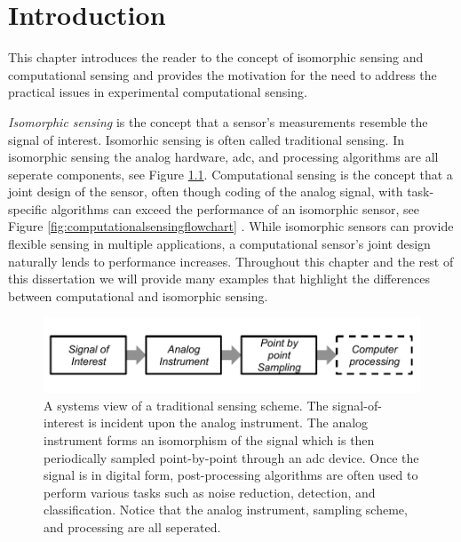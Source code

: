 

\chapter{Introduction}

This chapter introduces the reader to the concept of isomorphic sensing and computational sensing and provides the motivation for the need to address the practical issues in experimental computational sensing. 

\emph{Isomorphic sensing} is the concept that a sensor's measurements resemble the signal of interest. Isomorhic sensing is often called traditional sensing. In isomorphic sensing the analog hardware, \acrfull{adc}, and processing algorithms are all seperate components, see Figure \ref{fig:isomorphicsesingflowchart}. Computational sensing is the concept that a joint design of the sensor, often though coding of the analog signal, with task-specific algorithms can exceed the performance of an isomorphic sensor, see Figure \ref{fig:computationalsensingflowchart} \cite{neifeld2006taskSpecificSensing}. While isomorphic sensors can provide flexible sensing in multiple applications, a computational sensor's joint design naturally lends to performance increases. Throughout this chapter and the rest of this dissertation we will provide many examples that highlight the differences between computational and isomorphic sensing. 

\begin{figure}
    \centering
    \includegraphics[scale=1]{isomorphicsensorflowchart}
    \caption{A systems view of a traditional sensing scheme. The signal-of-interest is incident upon the analog instrument. The analog instrument forms an isomorphism of the signal which is then periodically sampled point-by-point through an \gls{adc} device. Once the signal is in digital form, post-processing algorithms are often used to perform various tasks such as noise reduction, detection, and classification. Notice that the analog instrument, sampling scheme, and processing are all seperated. }
    \label{fig:isomorphicsesingflowchart}
\end{figure}


